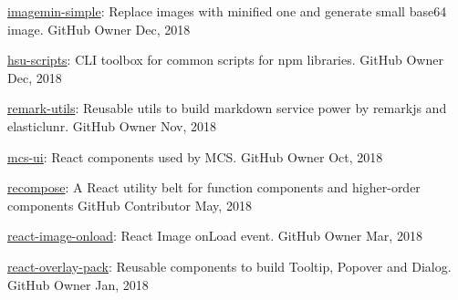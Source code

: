 \newpage
{}
\begin{cvhonors}


  \cvhonor
    {\href{https://github.com/evenchange4/imagemin-simple}{imagemin-simple}: \textmd{Replace images with minified one and generate small base64 image.}} %
    {GitHub} %
    {Owner} %
    {Dec, 2018} %

  \cvhonor
    {\href{https://github.com/evenchange4/hsu-scripts}{hsu-scripts}: \textmd{CLI toolbox for common scripts for npm libraries.}} %
    {GitHub} %
    {Owner} %
    {Dec, 2018} %

  \cvhonor
    {\href{https://github.com/evenchange4/remark-utils}{remark-utils}: \textmd{Reusable utils to build markdown service power by remarkjs and elasticlunr.}} %
    {GitHub} %
    {Owner} %
    {Nov, 2018} %

  \cvhonor
    {\href{https://github.com/Mediatek-Cloud/mcs-ui}{mcs-ui}: \textmd{React components used by MCS.}} %
    {GitHub} %
    {Owner} %
    {Oct, 2018} %

  \cvhonor
    {\href{https://github.com/acdlite/recompose}{recompose}: \textmd{A React utility belt for function components and higher-order components}} %
    {GitHub} %
    {Contributor} %
    {May, 2018} %

  \cvhonor
    {\href{https://github.com/evenchange4/react-image-onload}{react-image-onload}: \textmd{React Image onLoad event.}} %
    {GitHub} %
    {Owner} %
    {Mar, 2018} %

  \cvhonor
    {\href{https://github.com/evenchange4/react-overlay-pack}{react-overlay-pack}: \textmd{Reusable components to build Tooltip, Popover and Dialog.}} %
    {GitHub} %
    {Owner} %
    {Jan, 2018} %


\end{cvhonors}
